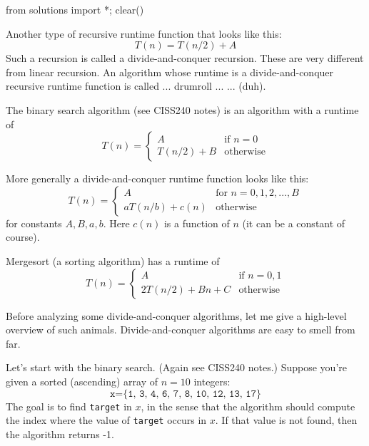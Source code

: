 \begin{python0}
from solutions import *; clear()
\end{python0}

\newcommand\LEFT{\texttt{left}}
\newcommand\MID{\texttt{mid}}
\newcommand\RIGHT{\texttt{right}}
\newcommand\TARGET{\texttt{target}}
\newcommand\MERGESORT{\texttt{mergesort}}


Another type of recursive runtime function that looks like this:
\[
T(n) = T(n / 2) + A
\]
Such a recursion is called a divide-and-conquer recursion.
These are very different from linear recursion.
An algorithm whose runtime is a divide-and-conquer recursive runtime function
is called ... drumroll ... 
 ... (duh).


\newpage
The binary search algorithm (see CISS240 notes) 
is an  algorithm with a runtime of 
\[
T(n) = 
\begin{cases}
A          & \text{if } n = 0 \\
T(n/2) + B & \text{otherwise}
\end{cases}
\]

More generally a divide-and-conquer runtime function looks like this:
\[
T(n) = 
\begin{cases}
A               & \text{for } n = 0, 1, 2, ..., B \\
a T(n/b) + c(n) & \text{otherwise}
\end{cases}
\]
for constants $A, B, a, b$. 
Here $c(n)$ is a function of $n$ (it can be a constant of course).

Mergesort (a sorting algorithm) has a runtime of 
\[
T(n) =
\begin{cases}
A            & \text{if $n = 0, 1$} \\
2T(n/2) + Bn + C & \text{otherwise}
\end{cases}
\]

Before analyzing some divide-and-conquer algorithms,
let me give a high-level overview of such animals.
Divide-and-conquer algorithms are easy to smell from far.

Let's start with the binary search.
(Again see CISS240 notes.)
Suppose you're given a sorted (ascending) array of $n=10$ integers:
\[
\texttt{x} = \texttt{\{1, 3, 4, 6, 7, 8, 10, 12, 13, 17\}}
\]
The goal is to find \verb!target! in $x$, in the sense that
the algorithm should compute the index where the value of 
\verb!target! occurs in $x$.
If that value is not found, then the algorithm returns 
-1.

